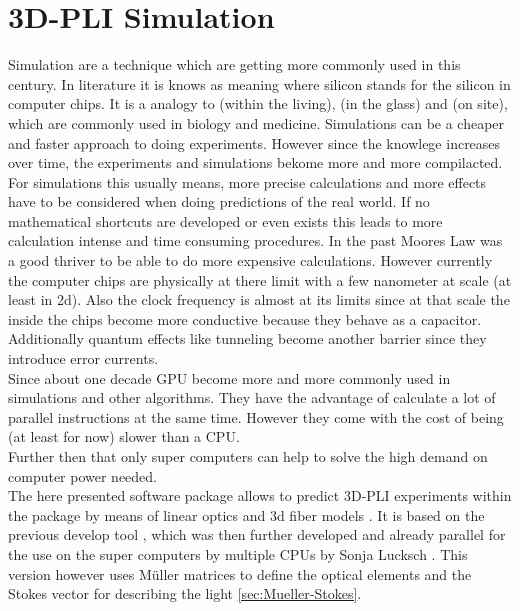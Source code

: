 \setcounter{chapter}{5}
\chapter{\acs{3D-PLI} Simulation}
\label{cha:simulation}
% 
Simulation are a technique which are getting more commonly used in this century.
In literature it is knows as  meaning  where silicon stands for the silicon in computer chips.
It is a analogy to  (within the living),  (in the glass) and  (on site), which are commonly used in biology and medicine.
Simulations can be a cheaper and faster approach to doing experiments.
However since the knowlege increases over time, the experiments and simulations bekome more and more compilacted.
For simulations this usually means, more precise calculations and more effects have to be considered when doing predictions of the real world.
If no mathematical shortcuts are developed or even exists this leads to more calculation intense and time consuming procedures.
In the past Moores Law was a good thriver to be able to do more expensive calculations.
However currently the computer chips are physically at there limit with a few nanometer at scale (at least in 2d).
Also the clock frequency is almost at its limits since at that scale the  inside the chips become more conductive because they behave as a capacitor.
Additionally quantum effects like tunneling become another barrier since they introduce error currents.
\\
% 
Since about one decade \acs{GPU} become more and more commonly used in simulations and other algorithms.
They have the advantage of calculate a lot of parallel instructions at the same time.
However they come with the cost of being (at least for now) slower than a \ac{CPU}.
\\
% 
Further then that only super computers can help to solve the high demand on computer power needed.
\\[\baselineskip]
% 
The here presented \fastpli{} software package allows to predict \ac{3D-PLI} experiments within the \python package  by means of linear optics \cite{} and 3d fiber models \cite{}.
It is based on the previous develop tool \simpli{} \cite{Dohmen2015}, which was then further developed and already parallel for the use on the super computers by multiple \acp{CPU} by Sonja Lucksch \cite{Lucksch2016}.
This version however uses M\"uller matrices \cite{} to define the optical elements and the Stokes vector \cite{} for describing the light \cref{sec:Mueller-Stokes}.
